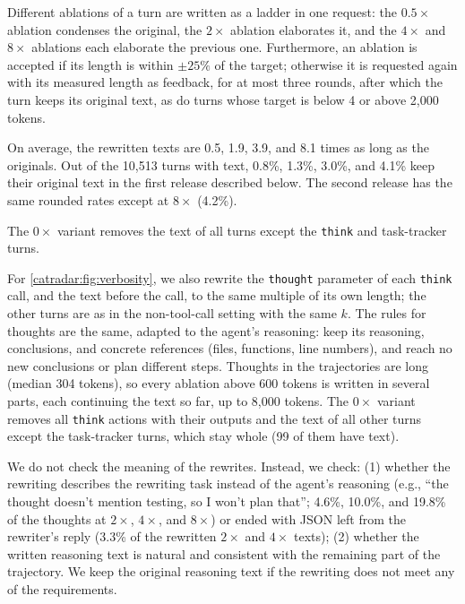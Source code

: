 Different ablations of a turn are written as a ladder in one request: the $0.5\times$ ablation condenses the original, the $2\times$ ablation elaborates it, and the $4\times$ and $8\times$ ablations each elaborate the previous one.
Furthermore, an ablation is accepted if its length is within $\pm 25\%$ of the target; otherwise it is requested again with its measured length as feedback, for at most three rounds, after which the turn keeps its original text, as do turns whose target is below 4 or above 2,000 tokens.

On average, the rewritten texts are 0.5, 1.9, 3.9, and 8.1 times as long as the originals.
Out of the 10,513 turns with text, 0.8\%, 1.3\%, 3.0\%, and 4.1\% keep their original text in the first release described below. The second release has the same rounded rates except at $8\times$ (4.2\%).

The $0\times$ variant removes the text of all turns except the \texttt{think} and task-tracker turns.

For \autoref{catradar:fig:verbosity}, we also rewrite the \texttt{thought} parameter of each \texttt{think} call, and the text before the call, to the same multiple of its own length; the other turns are as in the non-tool-call setting with the same $k$.
The rules for thoughts are the same, adapted to the agent's reasoning: keep its reasoning, conclusions, and concrete references (files, functions, line numbers), and reach no new conclusions or plan different steps.
Thoughts in the trajectories are long (median 304 tokens), so every ablation above 600 tokens is written in several parts, each continuing the text so far, up to 8,000 tokens.
The $0\times$ variant removes all \texttt{think} actions with their outputs and the text of all other turns except the task-tracker turns, which stay whole (99 of them have text).

We do not check the meaning of the rewrites.
Instead, we check: 
(1) whether the rewriting describes the rewriting task instead of the agent's reasoning (e.g., ``the thought doesn't mention testing, so I won't plan that''; 4.6\%, 10.0\%, and 19.8\% of the thoughts at $2\times$, $4\times$, and $8\times$) or ended with JSON left from the rewriter's reply (3.3\% of the rewritten $2\times$ and $4\times$ texts);
(2) whether the written reasoning text is natural and consistent with the remaining part of the trajectory.
We keep the original reasoning text if the rewriting does not meet any of the requirements.


